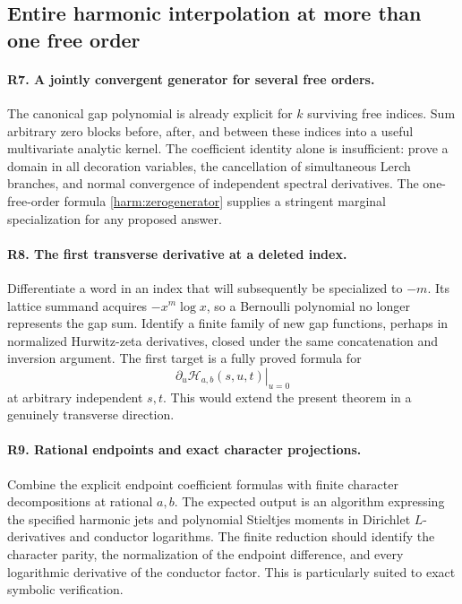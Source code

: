 \subsection{Entire harmonic interpolation at more than one free order}

\paragraph{R7. A jointly convergent generator for several free orders.}
The canonical gap polynomial is already explicit for
$k$ surviving free indices. Sum arbitrary zero blocks
before, after, and between these indices into a useful
multivariate analytic kernel. The coefficient identity
alone is insufficient: prove a domain in all decoration
variables, the cancellation of simultaneous Lerch
branches, and normal convergence of independent spectral
derivatives. The one-free-order formula
\eqref{harm:zerogenerator} supplies a stringent marginal
specialization for any proposed answer.

\paragraph{R8. The first transverse derivative at a deleted index.}
Differentiate a word in an index that will subsequently
be specialized to $-m$. Its lattice summand acquires
$-x^m\log x$, so a Bernoulli polynomial no longer
represents the gap sum. Identify a finite family of
new gap functions, perhaps in normalized Hurwitz-zeta
derivatives, closed under the same concatenation and
inversion argument. The first target is a fully proved
formula for
\[
 \left.\partial_u\mathcal H_{a,b}(s,u,t)\right|_{u=0}
\]
at arbitrary independent $s,t$. This would extend the
present theorem in a genuinely transverse direction.

\paragraph{R9. Rational endpoints and exact character projections.}
Combine the explicit endpoint coefficient formulas with
finite character decompositions at rational $a,b$.
The expected output is an algorithm expressing the
specified harmonic jets and polynomial Stieltjes moments
in Dirichlet $L$-derivatives and conductor logarithms.
The finite reduction should identify the character
parity, the normalization of the endpoint difference,
and every logarithmic derivative of the conductor
factor. This is particularly suited to exact symbolic
verification.

